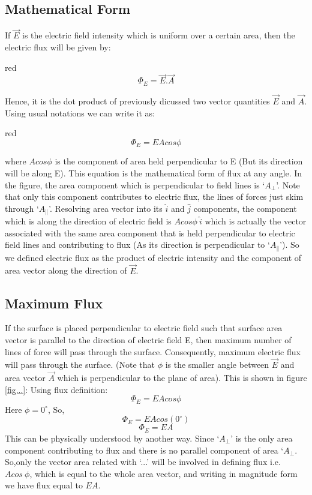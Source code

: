 \subsection*{Mathematical Form}
If $\vec{E}$ is the electric field intensity which is uniform over a certain area,
then the electric flux will be given by:
\begin{mybox}{red}{}
\begin{equation}\label{eq:11.17}
  \Phi_{E}  = \vec{E}.\vec{A}
\end{equation}
\end{mybox}
Hence, it is the dot product of previously dicussed two vector
quantities $\vec{E}$ and $\vec{A}$.
Using usual notations we can write it as:
\begin{mybox}{red}{}
\begin{equation}
  \Phi_{E} = EAcos\phi
\end{equation}
\end{mybox}
where $Acos\phi$ is the component of area held perpendicular to
E (But its direction will be along E).
This equation is the mathematical form of flux at any angle.
In the figure, the area component which is perpendicular
to field lines is  `$A_{\bot}$'. Note that only this component contributes
to electric flux, the lines of forces just skim through `$A_{\parallel}$'.
Resolving area vector into its $\hat{i}$ and $\hat{j}$ components,
the component which is along the direction of electric field is $Acos\phi\:\hat{i}$
which is actually the vector associated with the same area component
that is held perpendicular to electric field lines and contributing
to flux (As its direction is perpendicular to `$A_{\parallel}$').
So we defined electric flux as the product of electric
intensity and the component of area vector along the direction of $\vec{E}$.

\subsection*{Maximum Flux}
If the surface is placed perpendicular to electric field such
that surface area vector is parallel to the direction of electric field E,
then maximum number of lines of force will pass through the surface.
Consequently, maximum electric flux will pass through the surface.
(Note that $\phi$ is the smaller angle between $\vec{E}$ and area vector
$\vec{A}$ which is perpendicular to the plane of area).
This is shown in figure \ref{fig...}:
Using flux definition:
\begin{equation}
  \Phi_{E} = EAcos\phi \nonumber
\end{equation}
Here $\phi = 0^{\circ}$, So,
\begin{equation}
  \Phi_{E} = EAcos(0^{\circ}) \nonumber
\end{equation}
\begin{equation}
  \Phi_{E} = EA \nonumber
\end{equation}
This can be physically understood by another way.
Since `$A_{\bot}$' is the only area component contributing to flux and there
is no parallel component of area `$A_{\bot}$. So,only the vector area related with `...'
will be involved in defining flux i.e. $Acos\:\phi$, which is equal to the
whole area vector, and writing in magnitude form we have flux equal to $EA$.

